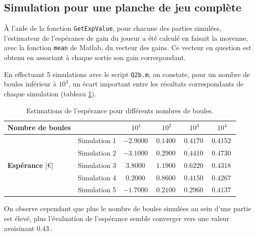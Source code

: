 \documentclass[a4paper, 12pt]{article}
\begin{document}
    \subsection{Simulation pour une planche de jeu complète}
    À l'aide de la fonction \texttt{GetExpValue}, pour chacune des parties simulées, l'estimateur de l'espérance de gain du joueur a été calculé en faisait la moyenne, avec la fonction \texttt{mean} de Matlab, du vecteur des gains. Ce vecteur en question  est obtenu en associant à chaque sortie son gain correspondant.\par
    En effectuant 5 simulations avec le script \texttt{Q2b.m}, on constate, pour un nombre de boules inférieur à \(10^3\), un écart important entre les résultats correspondants de chaque simulation (tableau \ref{table:tab_Q2b}).\par
    \begin{table}[!h]
        \centering
        \begin{tabular}{|l|l|c|c|c|c|}
            \hline
            \textbf{Nombre de boules} & & \(10^1\) & \(10^2\) & \(10^3\) & \(10^4\)\\
            \hline
            \hline
            \multirow{5}{*}{\textbf{Espérance} [\euro{}]} & Simulation 1 & \(\SI{-2.9000}{}\) & \(\SI{0.1400}{}\) & \(\SI{0.4170}{}\) & \(\SI{0.4152}{}\)\\
            & Simulation 2 & \(\SI{-3.1000}{}\) & \(\SI{0.2900}{}\) & \(\SI{0.4410}{}\) & \(\SI{0.4730}{}\)\\
            & Simulation 3 & \(\SI{3.8000}{}\) & \(\SI{1.1900}{}\) & \(\SI{0.6220}{}\) & \(\SI{0.4318}{}\)\\
            & Simulation 4 & \(\SI{0.2000}{}\) & \(\SI{0.8600}{}\) & \(\SI{0.4150}{}\) & \(\SI{0.4267}{}\)\\
            & Simulation 5 & \(\SI{-1.7000}{}\) & \(\SI{0.2100}{}\) & \(\SI{0.2960}{}\) & \(\SI{0.4137}{}\)\\
            \hline
        \end{tabular}
        \caption{Estimations de l'espérance pour différents nombres de boules.}
        \label{table:tab_Q2b}
    \end{table}
    On observe cependant que plus le nombre de boules simulées au sein d'une partie est élevé, plus l'évaluation de l'espérance semble converger vers une valeur avoisinant \(\SI{0.43}{}\).
\end{document}
